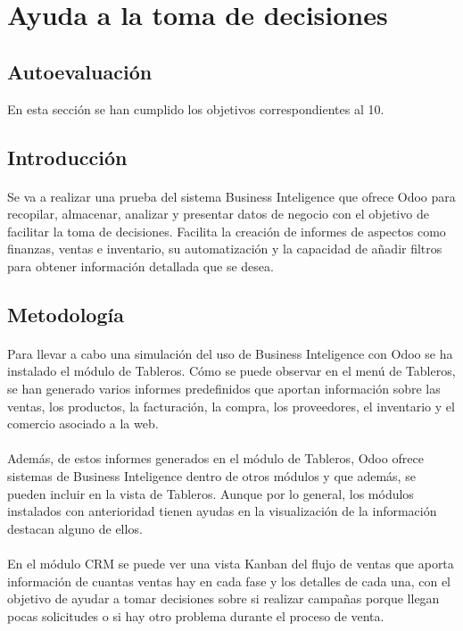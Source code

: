 \section{Ayuda a la toma de decisiones}
\subsection{Autoevaluación}
En esta sección se han cumplido los objetivos correspondientes al 10.
\subsection{Introducción}
\paragraph{}
 Se va a realizar una prueba del sistema Business Inteligence que ofrece Odoo para recopilar, almacenar, analizar y presentar datos de negocio con el objetivo de facilitar la toma de decisiones. Facilita la creación de informes de aspectos como finanzas, ventas e inventario, su automatización y la capacidad de añadir filtros para obtener información detallada que se desea.
\subsection{Metodología}
\paragraph{}
Para llevar a cabo una simulación del uso de Business Inteligence con Odoo se ha instalado el módulo de Tableros. Cómo se puede observar en el menú de Tableros, se han generado varios informes predefinidos que aportan información sobre las ventas, los productos, la facturación, la compra, los proveedores, el inventario y el comercio asociado a la web. 
\paragraph{}
Además, de estos informes generados en el módulo de Tableros, Odoo ofrece sistemas de Business Inteligence dentro de otros módulos y que además, se pueden incluir en la vista de Tableros. Aunque por lo general, los módulos instalados con anterioridad tienen ayudas en la visualización de la información destacan alguno de ellos. 
\paragraph{}
En el módulo CRM se puede ver una vista Kanban del flujo de ventas que aporta información de cuantas ventas hay en cada fase y los detalles de cada una, con el objetivo de ayudar a tomar decisiones sobre si realizar campañas porque llegan pocas solicitudes o si hay otro problema durante el proceso de venta. 

